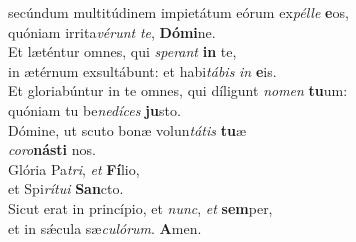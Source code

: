 \evenverse  secúndum multitúdinem impietátum eórum ex\textit{pél}\textit{le} \textbf{e}os,~\*\\
\evenverse quóniam irrita\textit{vé}\textit{runt} \textit{te}, \textbf{Dó}\textbf{mi}ne.\\
\oddverse Et læténtur omnes, qui \textit{spe}\textit{rant} \textbf{in} te,~\*\\
\oddverse in ætérnum exsultábunt: et habi\textit{tá}\textit{bis} \textit{in} \textbf{e}is.\\
\evenverse Et gloriabúntur in te omnes, qui díligunt \textit{no}\textit{men} \textbf{tu}um:~\*\\
\evenverse quóniam tu be\textit{ne}\textit{dí}\textit{ces} \textbf{ju}sto.\\
\oddverse Dómine, ut scuto bonæ volun\textit{tá}\textit{tis} \textbf{tu}æ~\*\\
\oddverse \textit{co}\textit{ro}\textbf{ná}\textbf{sti} nos.\\
\evenverse Glória Pa\textit{tri}, \textit{et} \textbf{Fí}lio,~\*\\
\evenverse et Spi\textit{rí}\textit{tu}\textit{i} \textbf{San}cto.\\
\oddverse Sicut erat in princípio, et \textit{nunc}, \textit{et} \textbf{sem}per,~\*\\
\oddverse et in sǽcula sæ\textit{cu}\textit{ló}\textit{rum}. \textbf{A}men.\\
